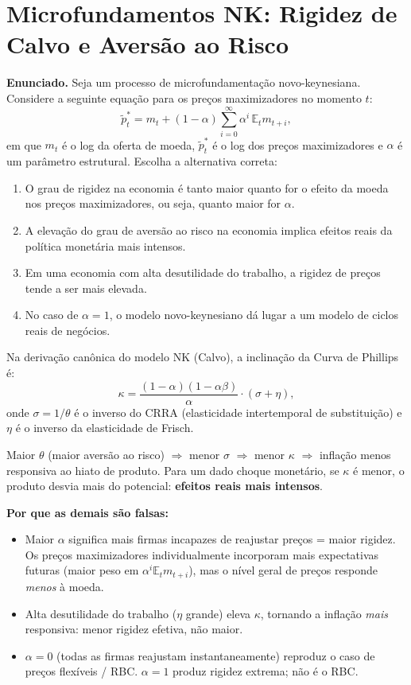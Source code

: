 \documentclass[12pt, a4paper]{article}
\newcommand{\E}{\mathbb{E}}
\begin{document}
\section{Microfundamentos NK: Rigidez de Calvo e Aversão ao Risco}

\textbf{Enunciado.} Seja um processo de microfundamentação novo-keynesiana. Considere a seguinte equação para os preços maximizadores no momento $t$:
\[
\tilde{p}_t^* = m_t + (1-\alpha)\sum_{i=0}^{\infty}\alpha^i\,\E_t m_{t+i},
\]
em que $m_t$ é o log da oferta de moeda, $\tilde{p}_t^*$ é o log dos preços maximizadores e $\alpha$ é um parâmetro estrutural. Escolha a alternativa correta:

\begin{enumerate}[label=\alph*)]
\item O grau de rigidez na economia é tanto maior quanto for o efeito da moeda nos preços maximizadores, ou seja, quanto maior for $\alpha$.
\item A elevação do grau de aversão ao risco na economia implica efeitos reais da política monetária mais intensos.
\item Em uma economia com alta desutilidade do trabalho, a rigidez de preços tende a ser mais elevada.
\item No caso de $\alpha = 1$, o modelo novo-keynesiano dá lugar a um modelo de ciclos reais de negócios.
\end{enumerate}

\begin{correctbox}[title={Resposta correta: b)}]
Na derivação canônica do modelo NK (Calvo), a inclinação da Curva de Phillips é:
\[
\kappa = \frac{(1-\alpha)(1-\alpha\beta)}{\alpha}\cdot(\sigma + \eta),
\]
onde $\sigma = 1/\theta$ é o inverso do CRRA (elasticidade intertemporal de substituição)
e $\eta$ é o inverso da elasticidade de Frisch.

Maior $\theta$ (maior aversão ao risco) $\Rightarrow$ menor $\sigma$
$\Rightarrow$ menor $\kappa$ $\Rightarrow$ inflação menos responsiva ao hiato de produto.
Para um dado choque monetário, se $\kappa$ é menor, o produto desvia mais do potencial:
\textbf{efeitos reais mais intensos}. \checkmark

\textbf{Por que as demais são falsas:}
\begin{itemize}[leftmargin=*]
\item[a)] Maior $\alpha$ significa mais firmas incapazes de reajustar preços = maior rigidez.
Os preços maximizadores individualmente incorporam mais expectativas futuras (maior peso em
$\alpha^i \E_t m_{t+i}$), mas o nível geral de preços responde \emph{menos} à moeda.
\item[c)] Alta desutilidade do trabalho ($\eta$ grande) eleva $\kappa$, tornando a inflação
\emph{mais} responsiva: menor rigidez efetiva, não maior.
\item[d)] $\alpha = 0$ (todas as firmas reajustam instantaneamente) reproduz o caso de
preços flexíveis / RBC. $\alpha = 1$ produz rigidez extrema; não é o RBC.
\end{itemize}
\end{correctbox}
\end{document}
